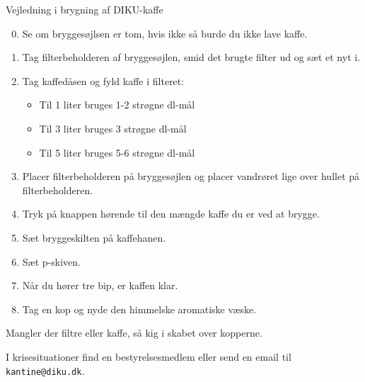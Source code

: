 \documentclass{article}
\begin{document}

\maketitle

\null
\vspace{-0.2cm}

\fontsize{18}{20}\selectfont

\hspace{-0.7cm}\noindent Vejledning i brygning af DIKU-kaffe

\begin{enumerate}

\setcounter{enumi}{-1}

\itemsep0em

\item Se om bryggesøjlsen er tom, hvis ikke så burde du ikke lave kaffe.

\item Tag filterbeholderen af bryggesøjlen, smid det brugte filter ud og sæt et
nyt i.

\item Tag kaffedåsen og fyld kaffe i filteret:

\begin{itemize}

\bfseries

\item Til 1 liter bruges 1-2 strøgne dl-mål

\item Til 3 liter bruges 3 strøgne dl-mål

\item Til 5 liter bruges 5-6 strøgne dl-mål


\end{itemize} \normalfont

\item Placer filterbeholderen på bryggesøjlen og placer vandrøret lige over
hullet på filterbeholderen.

\item Tryk på knappen hørende til den mængde kaffe du er ved at brygge.

\item Sæt bryggeskilten på kaffehanen.

\item Sæt p-skiven.

\item Når du hører tre bip, er kaffen klar.

\item Tag en kop og nyde den himmelske aromatiske væske.

\end{enumerate}

\vspace{0.2cm}

\LARGE

\begin{center}

Mangler der filtre eller kaffe, så kig i skabet over kopperne.

I krisesituationer find en bestyrelsesmedlem eller send en email til
\texttt{kantine@diku.dk}.

\end{center}

\underskriv
\end{document}

